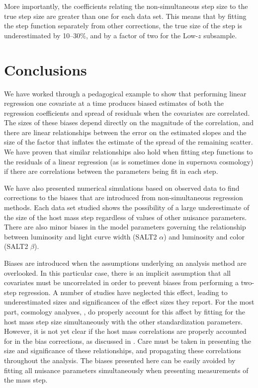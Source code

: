 More importantly, the coefficients relating the non-simultaneous step size to the true step size are greater than one for each data set. This means that by fitting the step function separately from other corrections, the true size of the step is underestimated by 10--30\%, and by a factor of two for the Low-$z$ subsample.

\section{Conclusions}
\label{sec:conclusion}
We have worked through a pedagogical example to show that performing linear regression one covariate at a time produces biased estimates of both the regression coefficients and spread of residuals when the covariates are correlated. The sizes of these biases depend directly on the magnitude of the correlation, and there are linear relationships between the error on the estimated slopes and the size of the factor that inflates the estimate of the spread of the remaining scatter. We have proven that similar relationships also hold when fitting step functions to the residuals of a linear regression (as is sometimes done in supernova cosmology) if there are correlations between the parameters being fit in each step. 

We have also presented numerical simulations based on observed data to find corrections to the biases that are introduced from non-simultaneous regression methods. Each data set studied shows the possibility of a large underestimate of the size of the host mass step regardless of values of other nuisance parameters. There are also minor biases in the model parameters governing the relationship between luminosity and light curve width (SALT2 $\alpha$) and luminosity and color (SALT2 $\beta$).

Biases are introduced when the assumptions underlying an analysis method are overlooked. In this particular case, there is an implicit assumption that all covariates must be uncorrelated in order to prevent biases from performing a two-step regression. A number of studies \citep[e.g.][]{kelly_hubble_2010, sullivan_dependence_2010, childress_host_2013, jones_reconsidering_2015, jones_should_2018, rose_think_2019, kelsey_effect_2020} have neglected this effect, leading to underestimated sizes and significances of the effect sizes they report. For the most part, cosmology analyses, \citep[e.g.][]{betoule_improved_2014, scolnic_complete_2018, smith_first_2020}, do properly account for this affect by fitting for the host mass step size simultaneously with the other standardization parameters. However, it is not yet clear if the host mass correlations are properly accounted for in the bias corrections, as discussed in \citet{smith_first_2020}. Care must be taken in presenting the size and significance of these relationships, and propagating these correlations throughout the analysis. The biases presented here can be easily avoided by fitting all nuisance parameters simultaneously when presenting measurements of the mass step.

